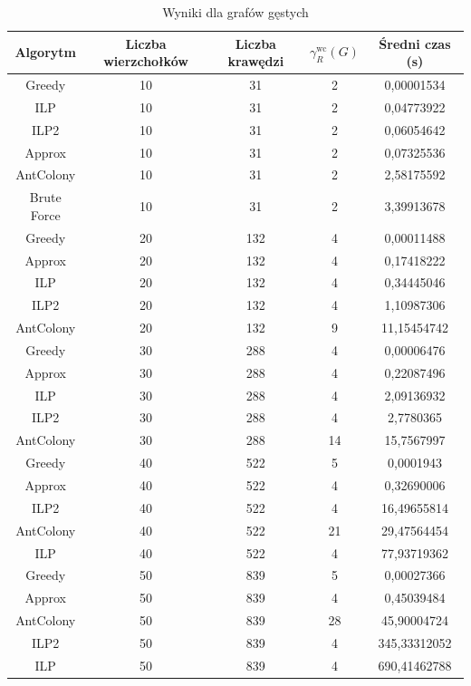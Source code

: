 \begin{table}[H]
    \centering
    \begin{tabular}{|c|c|c|c|c|}
    \hline
    Algorytm & Liczba wierzchołków & Liczba krawędzi & $\gamma^{\text{wc}}_R(G)$ & Średni czas (s) \\
    \hline
    Greedy & 10 & 31 & 2 & 0,00001534 \\
    ILP & 10 & 31 & 2 & 0,04773922 \\
    ILP2 & 10 & 31 & 2 & 0,06054642 \\
    Approx & 10 & 31 & 2 & 0,07325536 \\
    AntColony & 10 & 31 & 2 & 2,58175592 \\
    Brute Force & 10 & 31 & 2 & 3,39913678 \\
     \hline
     Greedy & 20 & 132 & 4 & 0,00011488 \\
     Approx & 20 & 132 & 4 & 0,17418222 \\
     ILP & 20 & 132 & 4 & 0,34445046 \\
     ILP2 & 20 & 132 & 4 & 1,10987306 \\
     AntColony & 20 & 132 & 9 & 11,15454742 \\
    \hline
    Greedy & 30 & 288 & 4 & 0,00006476 \\
    Approx & 30 & 288 & 4 & 0,22087496 \\
    ILP & 30 & 288 & 4 & 2,09136932 \\
    ILP2 & 30 & 288 & 4 & 2,7780365 \\
    AntColony & 30 & 288 & 14 & 15,7567997 \\
    \hline
    Greedy & 40 & 522 & 5 & 0,0001943 \\
    Approx & 40 & 522 & 4 & 0,32690006 \\
    ILP2 & 40 & 522 & 4 & 16,49655814 \\
    AntColony & 40 & 522 & 21 & 29,47564454 \\
    ILP & 40 & 522 & 4 & 77,93719362 \\
    \hline
    Greedy & 50 & 839 & 5 & 0,00027366 \\
    Approx & 50 & 839 & 4 & 0,45039484 \\
    AntColony & 50 & 839 & 28 & 45,90004724 \\
    ILP2 & 50 & 839 & 4 & 345,33312052 \\
    ILP & 50 & 839 & 4 & 690,41462788 \\

    \hline
    \end{tabular}
    \caption{Wyniki dla grafów gęstych}
    \end{table}

